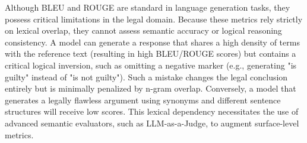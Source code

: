 Although BLEU and ROUGE are standard in language generation tasks, they possess critical limitations in the legal domain. Because these metrics rely strictly on lexical overlap, they cannot assess semantic accuracy or logical reasoning consistency. A model can generate a response that shares a high density of terms with the reference text (resulting in high BLEU/ROUGE scores) but contains a critical logical inversion, such as omitting a negative marker (e.g., generating "is guilty" instead of "is not guilty"). Such a mistake changes the legal conclusion entirely but is minimally penalized by n-gram overlap. Conversely, a model that generates a legally flawless argument using synonyms and different sentence structures will receive low scores. This lexical dependency necessitates the use of advanced semantic evaluators, such as LLM-as-a-Judge, to augment surface-level metrics.
